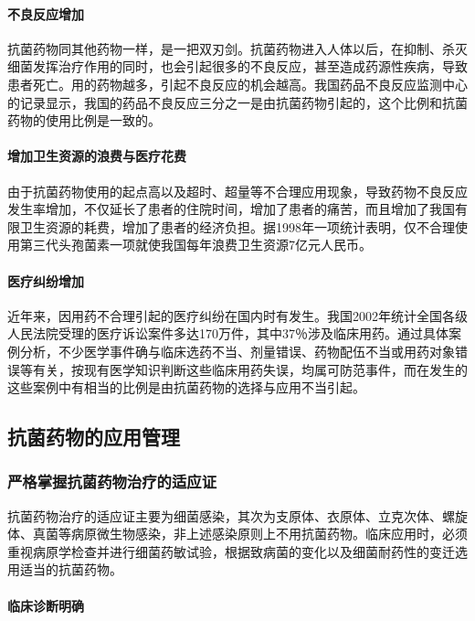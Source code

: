 \paragraph{不良反应增加}

抗菌药物同其他药物一样，是一把双刃剑。抗菌药物进入人体以后，在抑制、杀灭细菌发挥治疗作用的同时，也会引起很多的不良反应，甚至造成药源性疾病，导致患者死亡。用的药物越多，引起不良反应的机会越高。我国药品不良反应监测中心的记录显示，我国的药品不良反应三分之一是由抗菌药物引起的，这个比例和抗菌药物的使用比例是一致的。
\paragraph{增加卫生资源的浪费与医疗花费}

由于抗菌药物使用的起点高以及超时、超量等不合理应用现象，导致药物不良反应发生率增加，不仅延长了患者的住院时间，增加了患者的痛苦，而且增加了我国有限卫生资源的耗费，增加了患者的经济负担。据1998年一项统计表明，仅不合理使用第三代头孢菌素一项就使我国每年浪费卫生资源7亿元人民币。
\paragraph{医疗纠纷增加}

近年来，因用药不合理引起的医疗纠纷在国内时有发生。我国2002年统计全国各级人民法院受理的医疗诉讼案件多达170万件，其中37％涉及临床用药。通过具体案例分析，不少医学事件确与临床选药不当、剂量错误、药物配伍不当或用药对象错误等有关，按现有医学知识判断这些临床用药失误，均属可防范事件，而在发生的这些案例中有相当的比例是由抗菌药物的选择与应用不当引起。

\subsection{抗菌药物的应用管理}

\subsubsection{严格掌握抗菌药物治疗的适应证}

抗菌药物治疗的适应证主要为细菌感染，其次为支原体、衣原体、立克次体、螺旋体、真菌等病原微生物感染，非上述感染原则上不用抗菌药物。临床应用时，必须重视病原学检查并进行细菌药敏试验，根据致病菌的变化以及细菌耐药性的变迁选用适当的抗菌药物。
\paragraph{临床诊断明确}

